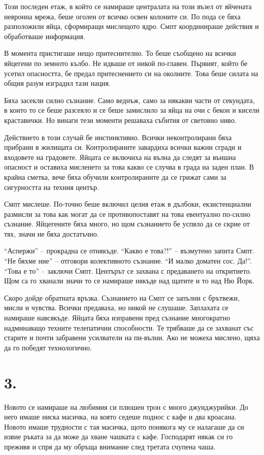\documentclass[ebook,openany,12pt]{memoir}
\begin{document}
Този последен етаж, в който се намираше централата на този възел от яйчената невронна мрежа, беше оголен от всичко освен колоните си. По пода се бяха разположили яйца, сформиращи мислещото ядро. Смпт координираше действия и обработваше информация.

В момента пристигаше нещо притеснително. То беше съобщено на всички яйцегени по земното кълбо. Не идваше от никой по-главен. Първият, който бе усетил опасността, бе предал притеснението си на околните. Това беше силата на общия разум изградил тази нация.

Бяха засекли силно съзнание. Само веднъж, само за някакви части от секундата, в които то се беше разсеяло и се беше замислило за яйца на очи с бекон и кисели краставички. Но винаги тези моменти решаваха събития от световно ниво.

Действието в този случай бе инстинктивно. Всички неконтролирани бяха прибрани в жилищата си. Контролираните завардиха всички важни сгради и входовете на градовете. Яйцата се включиха на вълна да следят за външна опасност и оставиха мисленето за това какво се случва в града на заден план. В крайна сметка, вече бяха обучили контролираните да се грижат сами за сигурността на техния център.

Смпт мислеше. По-точно беше включил целия етаж в дълбоки, екзистенциални размисли за това как могат да се противопоставят на това евентуално по-силно съзнание. Яйцегените бяха много, но щом съзнанието бе успяло да се скрие от тях, значи не бяха достатъчно.

``Аспержи'' – прокрадна се отнякъде. ``Какво е това?!'' – възмутено запита Смпт. ``Не бяхме ние'' – отговори колективното съзнание. ``И малко доматен сос. Да!''. ``Това е то'' – заключи Смпт. Центърът се захвана с предаването на откритието. Щом са го хванали значи то се намираше някъде над щатите и то над Ню Йорк.

Скоро дойде обратната връзка. Съзнанието на Смпт се запълни с брътвежи, мисли и чувства. Всички предаваха, но никой не слушаше. Заплахата се намираше навсякъде. Яйцата бяха изправени пред съзнание многократно надминаващо техните телепатични способности. Те трябваше да се захванат със старите и почти забравени усилватели на пи-вълни. Ако не можеха мислено, щяха да го победят технологично.

\section*{3.}

Новото се намираше на любимия си плюшен трон с много джунджурийки. До него имаше ниска масичка, на която седеше поднос с кафе и два кроасана. Новото имаше трудности с тая масичка, щото понякога му се налагаше да си извие ръката за да може да хване чашката с кафе. Господарят някак си го преживя и спря да му обръща внимание след третата счупена чаша.
\end{document}
